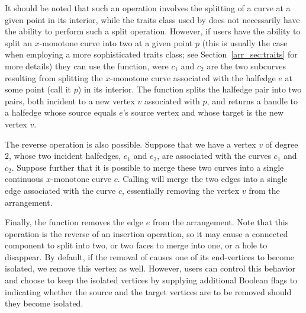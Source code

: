 It should be noted that such an operation involves the splitting
of a curve at a given point in its interior, while the traits
class used by  does not necessarily have the
ability to perform such a split operation. However, if users have
the ability to split an $x$-monotone curve into two at a given point
$p$ (this is usually the case when employing a more sophisticated
traits class; see Section~\ref{arr_sec:traits} for more details)
they can use the  function, were
$c_1$ and $c_2$ are the two subcurves resulting from splitting the
$x$-monotone curve associated with the halfedge $e$ at some point
(call it $p$) in its interior. The function splits the halfedge pair into two
pairs, both incident to a new vertex $v$ associated with $p$, and
returns a handle to a halfedge whose source equals $e$'s source
vertex and whose target is the new vertex $v$.

The reverse operation is also possible. Suppose that we have a
vertex $v$ of degree $2$, whose two incident halfedges, $e_1$ and
$e_2$, are associated with the curves $c_1$ and $c_2$. Suppose
further that it is possible to merge these two curves into a single
continuous $x$-monotone curve $c$. Calling 
will merge the two edges into a single edge associated with the curve
$c$, essentially removing the vertex $v$ from the arrangement.

Finally, the function  removes the edge $e$
from the arrangement. Note that this operation is the reverse of
an insertion operation, so it may cause a connected
component to split into two, or two faces to merge into one, or a
hole to disappear. By default, if the removal of  causes one
of its end-vertices to become isolated, we remove this vertex as well.
However, users can control this behavior and choose to keep the
isolated vertices by supplying additional Boolean flags to
 indicating whether the source and the target vertices
are to be removed should they become isolated.

